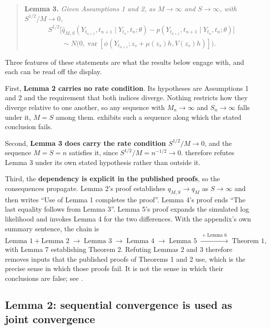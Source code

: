 \documentclass[11pt]{article}
\theoremstyle{definition}
\newcommand{\var}{\operatorname{var}}
\begin{document}
\begin{quote}
\textbf{Lemma 3.} \emph{Given Assumptions 1 and 2, as $M\to\infty$ and $S\to\infty$, with $S^{1/2}/M\to0$,}
\begin{align*}
&S^{1/2}\bigl[\widehat q_{M,S}(Y_{t_{n+1}},t_{n+1}\mid Y_{t_n},t_n;\theta)-p(Y_{t_{n+1}},t_{n+1}\mid Y_{t_n},t_n;\theta)\bigr]\\
&\qquad\sim N\bigl(0,\var[\phi(Y_{t_{n+1}};z_s+\mu(z_s)h,V(z_s)h)]\bigr).
\end{align*}
\end{quote}

Three features of these statements are what the results below engage with, and each can be read off the display.

First, \textbf{Lemma 2 carries no rate condition}. Its hypotheses are Assumptions 1 and 2 and the requirement that both indices diverge. Nothing restricts how they diverge relative to one another, so any sequence with $M_n\to\infty$ and $S_n\to\infty$ falls under it, $M=S$ among them.  exhibits such a sequence along which the stated conclusion fails.

Second, \textbf{Lemma 3 does carry the rate condition $S^{1/2}/M\to0$}, and the sequence $M=S=n$ satisfies it, since $S^{1/2}/M=n^{-1/2}\to0$.  therefore refutes Lemma 3 under its own stated hypothesis rather than outside it.

Third, the \textbf{dependency is explicit in the published proofs}, so the consequences propagate. Lemma 2's proof establishes $\widehat q_{M,S}\to q_M$ as $S\to\infty$ and then writes ``Use of Lemma 1 completes the proof''. Lemma 4's proof ends ``The last equality follows from Lemma 3''. Lemma 5's proof expands the simulated log likelihood and invokes Lemma 4 for the two differences. With the appendix's own summary sentence, the chain is
\[
\text{Lemma 1}+\text{Lemma 2}\;\longrightarrow\;\text{Lemma 3}\;\longrightarrow\;\text{Lemma 4}\;\longrightarrow\;\text{Lemma 5}\;\xrightarrow{\;+\;\text{Lemma 6}\;}\;\text{Theorem 1},
\]
with Lemma 7 establishing Theorem 2. Refuting Lemmas 2 and 3 therefore removes inputs that the published proofs of Theorems 1 and 2 use, which is the precise sense in which those proofs fail. It is not the sense in which their conclusions are false; see .

\subsection{Lemma 2: sequential convergence is used as joint convergence}
\end{document}
